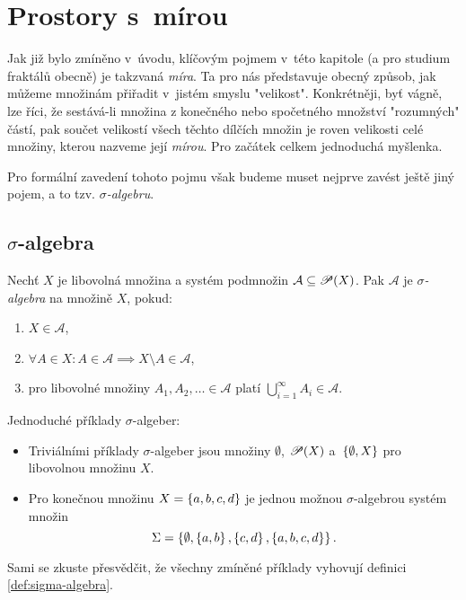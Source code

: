 \section{Prostory s~mírou}\label{sec:prostory-s-mirou}

Jak již bylo zmíněno v~úvodu, klíčovým pojmem v~této kapitole (a pro studium fraktálů obecně) je takzvaná \emph{míra}. Ta pro nás představuje obecný způsob, jak můžeme množinám přiřadit v~jistém smyslu "velikost". Konkrétněji, byť vágně, lze říci, že sestává-li množina z konečného nebo spočetného množství "rozumných" částí, pak součet velikostí všech těchto dílčích množin je roven velikosti celé množiny, kterou nazveme její \emph{mírou}. Pro začátek celkem jednoduchá myšlenka.

Pro formální zavedení tohoto pojmu však budeme muset nejprve zavést ještě jiný pojem, a to tzv. \emph{$\sigma$-algebru}.

\subsection{$\sigma$-algebra}\label{subsec:sigma-algebra}

\begin{definition}\label{def:sigma-algebra}
    Nechť $X$ je libovolná množina a systém podmnožin $\mathcal{A}\subseteq\mathscr{P}(X)$. Pak $\mathcal{A}$ je \emph{$\sigma$-algebra} na množině $X$, pokud:
    \begin{enumerate}[label=(\roman*)]
        \item\label{def:sigma-algebra-podm1} $X\in\mathcal{A}$,
        \item\label{def:sigma-algebra-podm2} $\forall A\in X: A\in\mathcal{A}\implies X\setminus A\in\mathcal{A}$,
        \item\label{def:sigma-algebra-podm3} pro libovolné množiny $A_1,A_2,\ldots\in\mathcal{A}$ platí $\bigcup_{i=1}^\infty A_i\in\mathcal{A}$.
    \end{enumerate}
\end{definition}

\begin{example}
    Jednoduché příklady $\sigma$-algeber:
    \begin{itemize}
        \item Triviálními příklady $\sigma$-algeber jsou množiny $\emptyset$, $\mathscr{P}(X)$ a~$\left\{\emptyset,X\right\}$ pro libovolnou množinu $X$.
        \item Pro konečnou množinu $X=\left\{a,b,c,d\right\}$ je jednou možnou $\sigma$-algebrou systém množin
        \[\Sigma=\left\{\emptyset,\left\{a,b\right\},\left\{c,d\right\},\left\{a,b,c,d\right\}\right\}.\]
    \end{itemize}
    Sami se zkuste přesvědčit, že všechny zmíněné příklady vyhovují definici \ref{def:sigma-algebra}.
\end{example}

